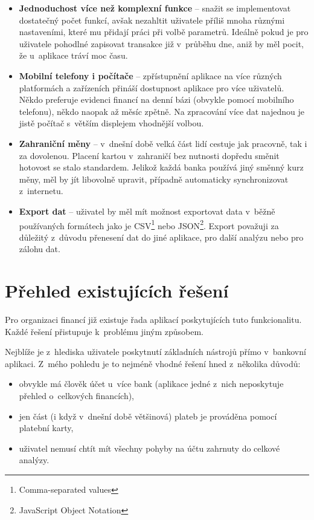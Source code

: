 \documentclass[
  biblatex,
  figures=true,
  tables=false,
  glossaries,
  index
]{kidiplom}
\begin{document}
\begin{itemize}
  \item \textbf{Jednoduchost více než komplexní funkce} -- snažit se implementovat dostatečný počet funkcí, avšak nezahltit uživatele příliš mnoha různými nastaveními, které mu přidají práci při volbě parametrů. Ideálně pokud je pro uživatele pohodlné zapisovat transakce již v~průběhu dne, aniž by měl pocit, že u~aplikace tráví moc času.
  \item \textbf{Mobilní telefony i počítače} -- zpřístupnění aplikace na více různých platformách a zařízeních přináší dostupnost aplikace pro více uživatelů. Někdo preferuje evidenci financí na denní bázi (obvykle pomocí mobilního telefonu), někdo naopak až měsíc zpětně. Na zpracování více dat najednou je jistě počítač s~větším displejem vhodnější volbou.
  \item \textbf{Zahraniční měny} -- v~dnešní době velká část lidí cestuje jak pracovně, tak i za dovolenou. Placení kartou v~zahraničí bez nutnosti dopředu směnit hotovost se stalo standardem. Jelikož každá banka používá jiný směnný kurz měny, měl by jít libovolně upravit, případně automaticky synchronizovat z~internetu.
  \item \textbf{Export dat} -- uživatel by měl mít možnost exportovat data v~běžně používaných formátech jako je CSV\footnote{Comma-separated values} nebo JSON\footnote{JavaScript Object Notation}. Export považuji za důležitý z~důvodu přenesení dat do jiné aplikace, pro další analýzu nebo pro zálohu dat.
\end{itemize}

\section{Přehled existujících řešení}
Pro organizaci financí již existuje řada aplikací poskytujících tuto funkcionalitu. Každé řešení přistupuje k~problému jiným způsobem. 

Nejblíže je z~hlediska uživatele poskytnutí základních nástrojů přímo v~bankovní aplikaci. Z~mého pohledu je to nejméně vhodné řešení hned z~několika důvodů:
\begin{itemize}
  \item obvykle má člověk účet u~více bank (aplikace jedné z~nich neposkytuje přehled o~celkových financích),
  \item jen část (i když v~dnešní době většinová) plateb je prováděna pomocí platební karty,
  \item uživatel nemusí chtít mít všechny pohyby na účtu zahrnuty do celkové analýzy.
\end{itemize}
\end{document}
